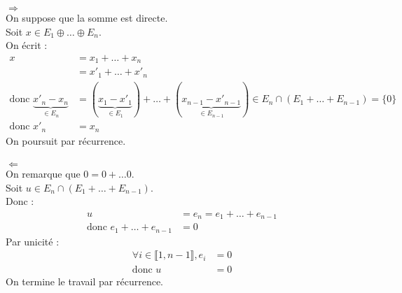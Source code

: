 \documentclass[../main.tex]{subfiles}
\begin{document}
$\boxed{\Rightarrow}$ \\
On suppose que la somme est directe. \\
Soit $x \in E_1 \oplus \ldots \oplus E_n$. \\
On écrit : 
\begin{align*}
    x &= x_1 + \ldots + x_n \\
    &= x'_1 + \ldots + x'_n \\
    \text{donc } \underbrace{x'_n - x_n}_{\in E_n} &= (\underbrace{x_1 - x'_1}_{\in E_1}) + \ldots + (\underbrace{x_{n-1} - x'_{n-1}}_{\in E_{n-1}}) \in E_n \cap (E_1 + \ldots + E_{n-1}) = \{0\} \\
    \text{donc } x'_n &= x_n
\end{align*}
On poursuit par récurrence. \\ \\

$\boxed{\Leftarrow}$ \\
On remarque que $0 = 0 + \ldots 0$. \\
Soit $u \in E_n \cap (E_1 + \ldots + E_{n-1})$. \\
Donc : 
\begin{align*}
    u &= e_n = e_1 + \ldots + e_{n-1} \\
    \text{donc } e_1 + \ldots + e_{n-1} &= 0
\end{align*}
Par unicité : 
\begin{align*}
    \forall i \in \llbracket 1, n-1 \rrbracket, e_i &= 0 \\
    \text{donc } u &= 0
\end{align*}
On termine le travail par récurrence. 
\end{document}
